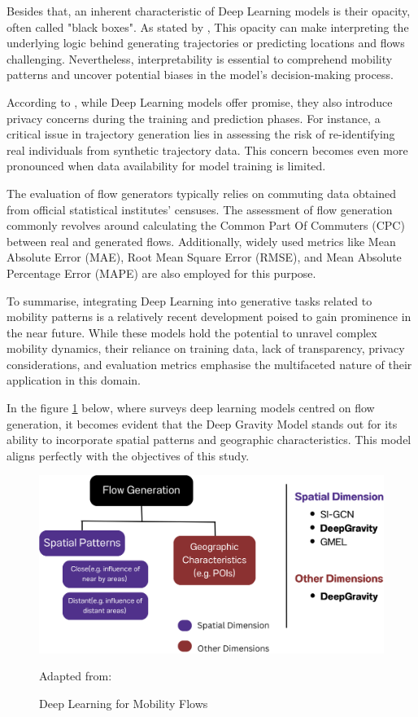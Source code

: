     Besides that, an inherent characteristic of Deep Learning models is their opacity, often called "black boxes". As stated by \cite{lucaSurveyDeepLearning2021}, This opacity can make interpreting the underlying logic behind generating trajectories or predicting locations and flows challenging. Nevertheless, interpretability is essential to comprehend mobility patterns and uncover potential biases in the model's decision-making process.
        
    According to \cite{lucaSurveyDeepLearning2021}, while Deep Learning models offer promise, they also introduce privacy concerns during the training and prediction phases. For instance, a critical issue in trajectory generation lies in assessing the risk of re-identifying real individuals from synthetic trajectory data. This concern becomes even more pronounced when data availability for model training is limited.
        
    The evaluation of flow generators typically relies on commuting data obtained from official statistical institutes' censuses. The assessment of flow generation commonly revolves around calculating the Common Part Of Commuters (CPC) between real and generated flows. Additionally, widely used metrics like Mean Absolute Error (MAE), Root Mean Square Error (RMSE), and Mean Absolute Percentage Error (MAPE) are also employed for this purpose.
        
    To summarise, integrating Deep Learning into generative tasks related to mobility patterns is a relatively recent development poised to gain prominence in the near future. While these models hold the potential to unravel complex mobility dynamics, their reliance on training data, lack of transparency, privacy considerations, and evaluation metrics emphasise the multifaceted nature of their application in this domain. 

    In the figure \ref{fig: DG evaluation} below, where \cite{lucaSurveyDeepLearning2021} surveys deep learning models centred on flow generation, it becomes evident that the Deep Gravity Model stands out for its ability to incorporate spatial patterns and geographic characteristics. This model aligns perfectly with the objectives of this study.

    \begin{figure}[H]
        \centering
        \includegraphics[width=12cm]{Images/deepgravity_fig.png}
        \caption{Deep Learning for Mobility Flows}
        \footnotesize{Adapted from: \cite{lucaSurveyDeepLearning2021}}
        \label{fig: DG evaluation}
    \end{figure}

